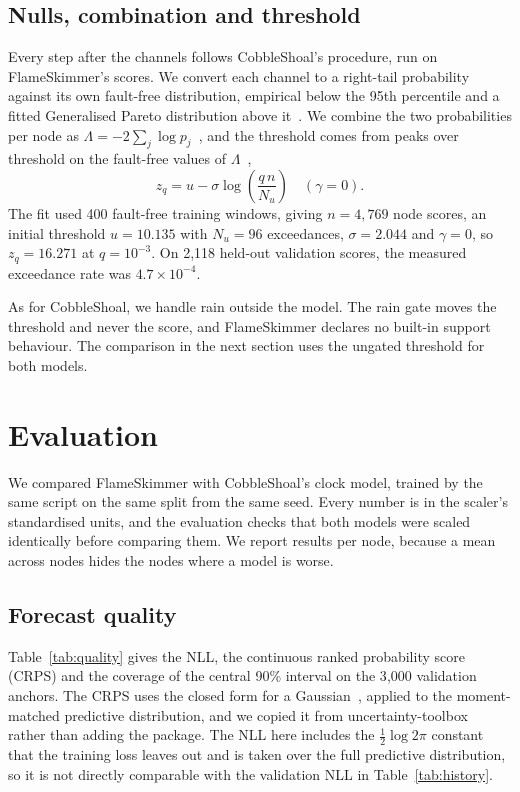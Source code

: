 \documentclass{article}
\begin{document}
\subsection{Nulls, combination and threshold}
\label{sec:calibration}

Every step after the channels follows CobbleShoal's procedure, run on
FlameSkimmer's scores. We convert each channel to a right-tail probability
against its own fault-free distribution, empirical below the 95th percentile
and a fitted Generalised Pareto distribution above it~\citep{pickands1975gpd}.
We combine the two probabilities per node as
$\Lambda = -2 \sum_{j} \log p_{j}$~\citep{fisher1925methods}, and the
threshold comes from peaks over threshold on the fault-free values of
$\Lambda$~\citep{siffer2017spot},
\begin{equation}
  z_{q} = u - \sigma \log\!\left(\frac{q\,n}{N_{u}}\right) \quad (\gamma = 0).
\end{equation}
The fit used 400 fault-free training windows, giving $n = 4{,}769$ node scores,
an initial threshold $u = 10.135$ with $N_{u} = 96$ exceedances,
$\sigma = 2.044$ and $\gamma = 0$, so $z_{q} = 16.271$ at $q = 10^{-3}$. On
2{,}118 held-out validation scores, the measured exceedance rate was
$4.7 \times 10^{-4}$.

As for CobbleShoal, we handle rain outside the model. The rain gate moves the
threshold and never the score, and FlameSkimmer declares no built-in support
behaviour. The comparison in the next section uses the ungated threshold for
both models.

\section{Evaluation}
\label{sec:evaluation}

We compared FlameSkimmer with CobbleShoal's clock model, trained by the same
script on the same split from the same seed. Every number is in the scaler's
standardised units, and the evaluation checks that both models were scaled
identically before comparing them. We report results per node, because a mean
across nodes hides the nodes where a model is worse.

\subsection{Forecast quality}
\label{sec:quality}

Table~\ref{tab:quality} gives the NLL, the continuous ranked probability score
(CRPS) and the coverage of the central 90\% interval on the 3{,}000 validation
anchors. The CRPS uses the closed form for a Gaussian~\citep{gneiting2007scoring},
applied to the moment-matched predictive distribution, and we copied it from
uncertainty-toolbox~\citep{chung2021toolbox} rather than adding the package.
The NLL here includes the $\tfrac{1}{2}\log 2\pi$ constant that the training
loss leaves out and is taken over the full predictive distribution, so it is
not directly comparable with the validation NLL in Table~\ref{tab:history}.
\end{document}
